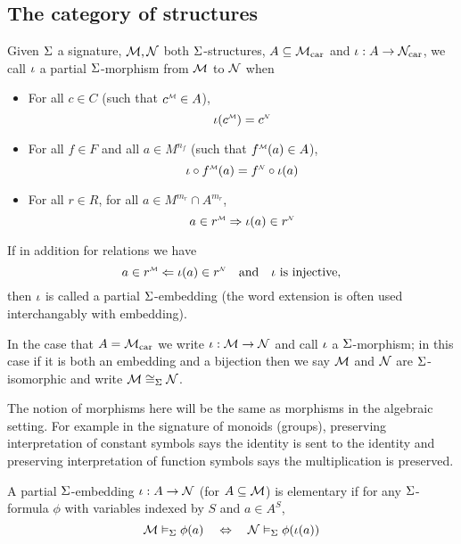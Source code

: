 \subsection{The category of structures}
\begin{dfn}
    Given $\Sigma$ a signature, 
    $\mathcal{M}, \mathcal{N}$ both $\Sigma$-structures, $A \subseteq {\mathcal{M}}_\mathrm{car}$
    and $\iota : A \to {\mathcal{N}}_\mathrm{car}$,
    we call $\iota$ a partial $\Sigma$-morphism from $\mathcal{M}$ to $\mathcal{N}$ when 
    \begin{itemize}
        \item For all $c \in C$ (such that $\mmintp{c} \in A$), 
        \[\io(\mmintp{c}) = \modintp{\NN}{c}\]
        \item For all $f \in F$ and all $a \in M^{n_f}$
        (such that $\mmintp{f}(a) \in A$), 
        \[\io \circ \mmintp{f}(a) = \modintp{\NN}{f} \circ \io(a)\]
        \item For all $r \in R$, for all $a \in M^{m_r} \cap A^{m_r}$,
        \[a \in \mmintp{r} \implies \io (a) \in \modintp{\NN}{r}\]
    \end{itemize}
    If in addition for relations we have
    \[a \in \mmintp{r} \limplies \io (a) \in \modintp{\NN}{r} \quad 
    \text{and} \quad \io \text { is injective,} \]
    then $\iota$ is called a partial $\Sigma$-embedding 
    (the word extension is often used interchangably with embedding). 

    In the case that $A = {\mathcal{M}}_\mathrm{car}$
    we write $\iota : \mathcal{M} \to \mathcal{N}$ and call $\iota$ a 
    $\Sigma$-morphism;
    in this case if it is both an embedding and a bijection then we say 
    $\mathcal{M}$ and $\mathcal{N}$ are $\Sigma$-isomorphic and write $\mathcal{M} \cong_\Sigma \mathcal{N}$.
\end{dfn}
The notion of morphisms here will be the same as 
morphisms in the algebraic setting.
For example in the signature of monoids (groups), 
preserving interpretation of constant symbols 
says the identity is sent to the identity 
and preserving interpretation of function symbols
says the multiplication is preserved.

\begin{dfn}
    A partial $\Sigma$-embedding $\iota : A \to \mathcal{N}$ (for $A \subseteq \mathcal{M}$)
    is elementary if for any $\Sigma$-formula $\phi$
    with variables indexed by $S$
    and $a \in A^S$,
    \[
        \mathcal{M} \vDash_{\Sigma} \phi(a) \quad \Leftrightarrow \quad \mathcal{N} \vDash_{\Sigma} \phi(\iota(a))
    \]
\end{dfn}


